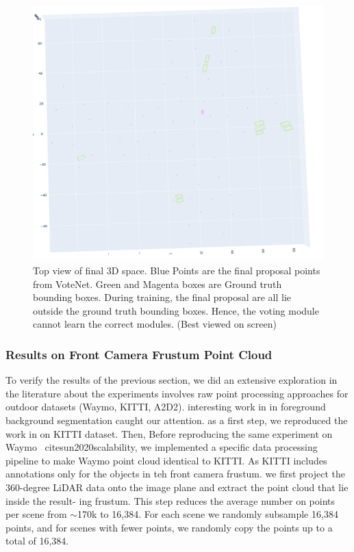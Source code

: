 \documentclass[10pt,twocolumn,letterpaper]{article}
\begin{document}
\begin{figure}
	\includegraphics[width=\linewidth]{media/votenet_proposal_points.png}
   \caption{Top view of final 3D space. Blue Points are the final proposal points from VoteNet. Green and Magenta boxes are Ground truth bounding boxes. During training, the final proposal are all lie outside the ground truth bounding boxes. Hence, the voting module cannot learn the correct modules. (Best viewed on screen)}
\label{fig:proposal_points}
\end{figure}

\subsubsection{Results on Front Camera Frustum Point Cloud}
To verify the results of the previous section, we did an extensive exploration in the literature about the experiments involves raw point processing approaches \cite{qi2017pointnet, qi2017pointnet++, qi2019deep, qi2018frustum, shi2019pointrcnn} for outdoor datasets (Waymo, KITTI, A2D2). interesting work in \cite{shi2019pointrcnn} in foreground background segmentation caught our attention. as a first step, we reproduced the work in \cite{shi2019pointrcnn} on KITTI dataset. Then, Before reproducing the same experiment on Waymo \ cite{sun2020scalability}, we implemented a specific data processing pipeline to make Waymo point cloud identical to KITTI. As KITTI includes annotations only for the objects in teh front camera frustum. we first project the 360-degree LiDAR data onto the image plane and extract the point cloud that lie inside the result- ing frustum. This step reduces the average number on points per scene from $\sim$170k to 16,384. For each scene we randomly subsample 16,384 points, and for scenes with fewer points, we randomly copy the points up to a total of 16,384.
\end{document}
